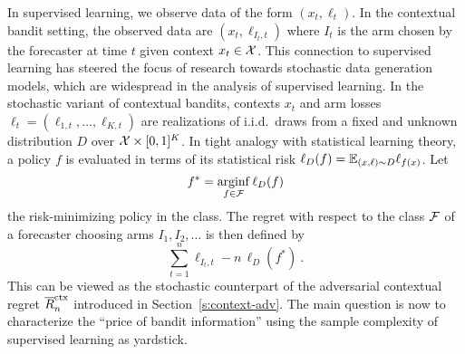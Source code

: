 In supervised learning, we observe data of the form $(x_t,\ell_t)$. In the contextual bandit setting, the observed data are $(x_t,\ell_{I_t,t})$ where $I_t$ is the arm chosen by the forecaster at time $t$ given context $x_t\in\mathcal{X}$. This connection to supervised learning has steered the focus of research towards stochastic data generation models, which are widespread in the analysis of supervised learning. In the stochastic variant of contextual bandits, contexts $x_t$ and arm losses $\ell_t = (\ell_{1,t},\dots,\ell_{K,t})$ are realizations of i.i.d.\ draws from a fixed and unknown distribution $D$ over $\mathcal{X} \times [0,1]^K$. In tight analogy with statistical learning theory, a policy $f$ is evaluated in terms of its statistical risk
$
    \ell_D(f) = \mathbb{E}_{(x,\ell) \sim D} \ell_{f(x)}
$.
Let
\[
    f^* = \mathop{\mathrm{arginf}}_{f\in\mathcal{F}} \ell_D(f)
\]
the risk-minimizing policy in the class.
The regret with respect to the class $\mathcal{F}$ of a forecaster choosing arms $I_1,I_2,\dots$ is then defined by
\[
    \sum_{t=1}^n \ell_{I_t,t} - n\,\ell_D(f^*)~.
\]
This can be viewed as the stochastic counterpart of the adversarial contextual regret $\overline{R}^{\mathrm{ctx}}_n$ introduced in Section~\ref{s:context-adv}. The main question is now to characterize the ``price of bandit information'' using the sample complexity of supervised learning as yardstick.

